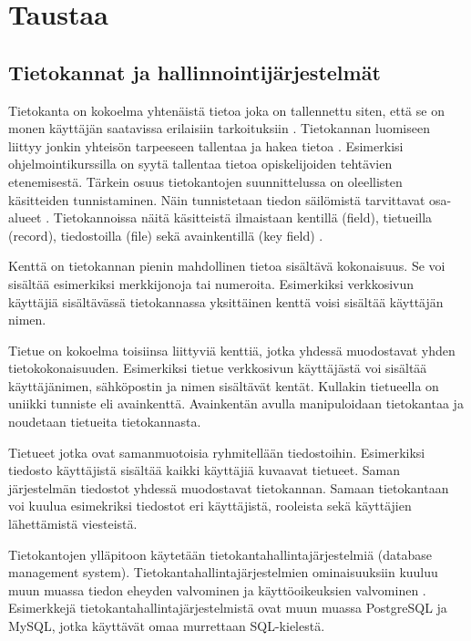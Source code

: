 \documentclass[finnish,twoside,openright]{HYgraduMLDS}
\begin{document}
\chapter{Taustaa\label{chapter:Taustaa}}

\section{Tietokannat ja hallinnointijärjestelmät}

Tietokanta on kokoelma yhtenäistä tietoa joka on tallennettu siten, että se on monen käyttäjän saatavissa erilaisiin tarkoituksiin \cite{pathak2007dbms}. Tietokannan luomiseen liittyy jonkin yhteisön tarpeeseen tallentaa ja hakea tietoa \cite{tikape2019}. Esimerkisi ohjelmointikurssilla on syytä tallentaa tietoa opiskelijoiden tehtävien etenemisestä. Tärkein osuus tietokantojen suunnittelussa on oleellisten käsitteiden tunnistaminen. Näin tunnistetaan tiedon säilömistä tarvittavat osa-alueet \cite{tikape2019}. Tietokannoissa näitä käsitteistä ilmaistaan kentillä (field), tietueilla (record), tiedostoilla (file) sekä avainkentillä (key field) \cite{pathak2007dbms}.

Kenttä on tietokannan pienin mahdollinen tietoa sisältävä kokonaisuus. Se voi sisältää esimerkiksi merkkijonoja tai numeroita. Esimerkiksi verkkosivun käyttäjiä sisältävässä tietokannassa yksittäinen kenttä voisi sisältää käyttäjän nimen.

Tietue on kokoelma toisiinsa liittyviä kenttiä, jotka yhdessä muodostavat yhden tietokokonaisuuden. Esimerkiksi tietue verkkosivun käyttäjästä voi sisältää käyttäjänimen, sähköpostin ja nimen sisältävät kentät. Kullakin tietueella on uniikki tunniste eli avainkenttä. Avainkentän avulla manipuloidaan tietokantaa ja noudetaan tietueita  tietokannasta.

Tietueet jotka ovat samanmuotoisia ryhmitellään tiedostoihin. Esimerkiksi tiedosto käyttäjistä sisältää kaikki käyttäjiä kuvaavat tietueet. Saman järjestelmän tiedostot yhdessä muodostavat tietokannan. Samaan tietokantaan voi kuulua esimekriksi tiedostot eri käyttäjistä, rooleista sekä käyttäjien lähettämistä viesteistä.

Tietokantojen ylläpitoon käytetään tietokantahallintajärjestelmiä (database management system). Tietokantahallintajärjestelmien ominaisuuksiin kuuluu muun muassa tiedon eheyden valvominen ja käyttöoikeuksien valvominen \cite{tikape2019}. Esimerkkejä tietokantahallintajärjestelmistä ovat muun muassa PostgreSQL ja MySQL, jotka käyttävät omaa murrettaan SQL-kielestä.
\end{document}
